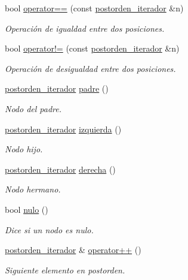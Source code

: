 \begin{DoxyCompactItemize}
\item 
bool \hyperlink{classArbolGeneral_1_1postorden__iterador_a3c823a060b37ab5be8a950b5a79188d3}{operator==} (const \hyperlink{classArbolGeneral_1_1postorden__iterador}{postorden\+\_\+iterador} \&n)
\begin{DoxyCompactList}\small\item\em Operación de igualdad entre dos posiciones. \end{DoxyCompactList}\item 
bool \hyperlink{classArbolGeneral_1_1postorden__iterador_a15ce3ad6eded0487e0b2b5a49abde5ce}{operator!=} (const \hyperlink{classArbolGeneral_1_1postorden__iterador}{postorden\+\_\+iterador} \&n)
\begin{DoxyCompactList}\small\item\em Operación de desigualdad entre dos posiciones. \end{DoxyCompactList}\item 
\hyperlink{classArbolGeneral_1_1postorden__iterador}{postorden\+\_\+iterador} \hyperlink{classArbolGeneral_1_1postorden__iterador_a939b113299035ac4f56c1ebc8c7de763}{padre} ()
\begin{DoxyCompactList}\small\item\em Nodo del padre. \end{DoxyCompactList}\item 
\hyperlink{classArbolGeneral_1_1postorden__iterador}{postorden\+\_\+iterador} \hyperlink{classArbolGeneral_1_1postorden__iterador_a41de2f17fa6fd5f76654770858d4f3b2}{izquierda} ()
\begin{DoxyCompactList}\small\item\em Nodo hijo. \end{DoxyCompactList}\item 
\hyperlink{classArbolGeneral_1_1postorden__iterador}{postorden\+\_\+iterador} \hyperlink{classArbolGeneral_1_1postorden__iterador_ae2b24cd3445cac918c67574c0879b189}{derecha} ()
\begin{DoxyCompactList}\small\item\em Nodo hermano. \end{DoxyCompactList}\item 
bool \hyperlink{classArbolGeneral_1_1postorden__iterador_a68390390c83bf6e26d9ea74d547f1b2c}{nulo} ()
\begin{DoxyCompactList}\small\item\em Dice si un nodo es nulo. \end{DoxyCompactList}\item 
\hyperlink{classArbolGeneral_1_1postorden__iterador}{postorden\+\_\+iterador} \& \hyperlink{classArbolGeneral_1_1postorden__iterador_a3b2f2622714676de99e67aa27a410b68}{operator++} ()
\begin{DoxyCompactList}\small\item\em Siguiente elemento en postorden. \end{DoxyCompactList}\end{DoxyCompactItemize}

